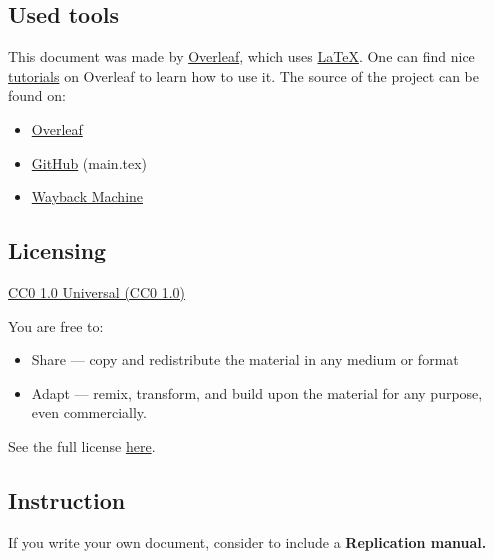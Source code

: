 \documentclass{article}
\begin{document}
\subsection{Used tools}

This document was made by \href{https://www.overleaf.com/}{Overleaf}, which uses \href{https://en.wikipedia.org/wiki/LaTeX}{LaTeX}.
One can find nice \href{https://www.overleaf.com/learn/latex/Tutorials}{tutorials} on Overleaf to learn how to use it. The source of the project can be found on:
\begin{itemize}
    \item \href{https://www.overleaf.com/read/vjhvckyttxxx}{Overleaf}
    \item \href{https://github.com/konczer/OpenCurriculum}{GitHub} (main.tex)
    \item \href{https://web.archive.org/web/*/https://github.com/konczer/OpenCurriculum/blob/main/main.tex}{Wayback Machine}
\end{itemize}

\subsection{Licensing}

\href{https://creativecommons.org/publicdomain/zero/1.0/}{CC0 1.0 Universal (CC0 1.0)}

You are free to:
\begin{itemize}
    \item Share — copy and redistribute the material in any medium or format
    \item Adapt — remix, transform, and build upon the material
    for any purpose, even commercially.
\end{itemize}

See the full license \href{https://creativecommons.org/publicdomain/zero/1.0/legalcode}{here}.

\subsection{Instruction}

If you write your own document, consider to include a \bf{Replication manual}.

\newpage

\tableofcontents \label{sec:toc}
\end{document}
